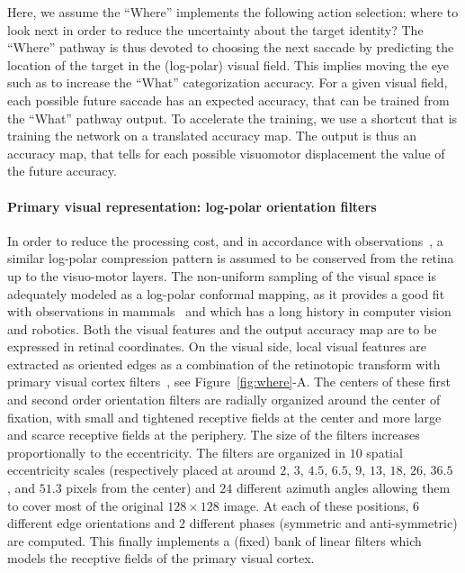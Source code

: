Here, we assume the ``Where'' implements the following action selection: where to look next in order to reduce the uncertainty about the target identity?
The ``Where'' pathway is thus devoted to choosing the next saccade by predicting the location of the target in the (log-polar) visual field.
This implies moving the eye such as to increase the ``What'' categorization accuracy. For a given visual field, each possible future saccade has an expected accuracy, that can be trained from the ``What'' pathway output. To accelerate the training, we use a shortcut that is training the network on a translated accuracy map. The output is thus an accuracy map, that tells for each possible visuomotor displacement the value of the future accuracy.

\paragraph{Primary visual representation: log-polar orientation filters}
In order to reduce the processing cost, and in accordance with observations~\cite{connolly1984representation,sparks1987sensory}, a similar log-polar compression pattern is assumed to be conserved from the retina up to the visuo-motor layers.
The non-uniform sampling of the visual space is adequately modeled as a log-polar conformal mapping, as it provides a good fit with observations in mammals~\cite{Traver10} and which has a long history in computer vision and robotics. Both the visual features and the output accuracy map are to be expressed in retinal coordinates. On the visual side, local visual features are extracted as oriented edges as a combination of the retinotopic transform with primary visual cortex filters~\cite{Fischer2007a}, see Figure~\ref{fig:where}-A. The centers of these first and second order orientation filters are radially organized around the center of fixation, with small and tightened receptive fields at the center and more large and scarce receptive fields at the periphery. The size of the filters increases proportionally to the eccentricity.  The filters are organized in $10$ spatial eccentricity scales (respectively placed at around $2$, $3$, $4.5$, $6.5$, $9$, $13$, $18$, $26$, $36.5$ , and $51.3$ pixels from the center) and $24$ different azimuth angles allowing them to cover most of the original $128 \times 128 $ image. At each of these positions, $6$ different edge orientations and $2$ different phases (symmetric and anti-symmetric) are computed. This finally implements a (fixed) bank of linear filters which models the receptive fields of the primary visual cortex.

